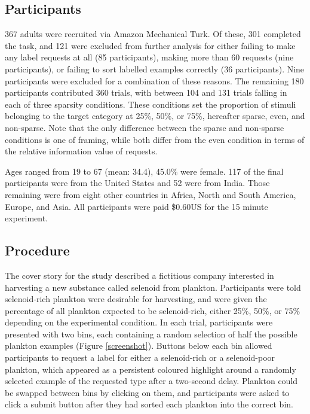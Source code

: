 \documentclass[10pt,letterpaper]{article}
\begin{document}
\subsection{Participants}

367 adults were recruited via Amazon Mechanical Turk.%
Of these, 301 completed the task, and 121 were excluded from further analysis for either failing to make any label requests at all (85 participants), making more than 60 requests (nine participants), or failing to sort labelled examples correctly (36 participants). Nine participants were excluded for a combination of these reasons.%
The remaining 180 participants contributed 360 trials, with between 104 and 131 trials falling in each of three sparsity conditions. These conditions set the proportion of stimuli belonging to the target category at 25\%, 50\%, or 75\%, hereafter { \sc sparse},{ \sc even}, and { \sc non-sparse}. Note that the only difference between the { \sc sparse} and { \sc non-sparse} conditions is one of framing, while both differ from the even condition in terms of the relative information value of requests.

Ages ranged from 19 to 67 (mean: 34.4), 45.0\% were female. 117 of the final participants were from the United States and 52 were from India. Those remaining were from eight other countries in Africa, North and South America, Europe, and Asia. All participants were paid \$0.60US for the 15 minute experiment.

\subsection{Procedure}

The cover story for the study described a fictitious company interested in harvesting a new substance called selenoid from plankton. Participants were told selenoid-rich plankton were desirable for harvesting, and were given the percentage of all plankton expected to be selenoid-rich, either 25\%, 50\%, or 75\% depending on the experimental condition. In each trial, participants were presented with two bins, each containing a random selection of half the possible plankton examples (Figure \ref{screenshot}). Buttons below each bin allowed participants to request a label for either a selenoid-rich or a selenoid-poor plankton, which appeared as a persistent coloured highlight around a randomly selected example of the requested type after a two-second delay. Plankton could be swapped between bins by clicking on them, and participants were asked to click a \textsf{submit} button after they had sorted each plankton into the correct bin.
\end{document}
